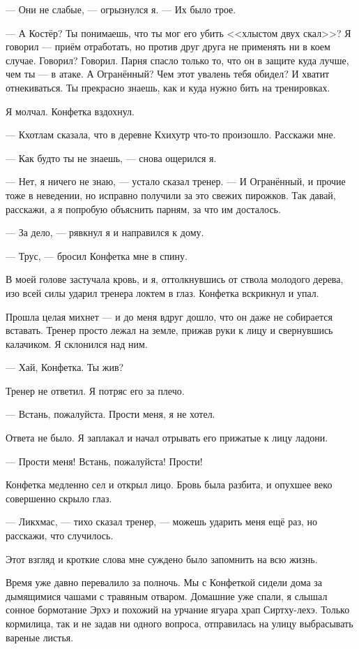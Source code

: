 --- Они не слабые, --- огрызнулся я.
--- Их было трое.

--- А Костёр?
Ты понимаешь, что ты мог его убить <<хлыстом двух скал>>?
Я говорил --- приём отработать, но против друг друга не применять ни в коем случае.
Говорил?
Говорил.
Парня спасло только то, что он в защите куда лучше, чем ты --- в атаке.
А Огранённый?
Чем этот увалень тебя обидел?
И хватит отнекиваться.
Ты прекрасно знаешь, как и куда нужно бить на тренировках.

Я молчал.
Конфетка вздохнул.

--- Кхотлам сказала, что в деревне Кхихутр что-то произошло.
Расскажи мне.

--- Как будто ты не знаешь, --- снова ощерился я.

--- Нет, я ничего не знаю, --- устало сказал тренер.
--- И Огранённый, и прочие тоже в неведении, но исправно получили за это свежих пирожков.
Так давай, расскажи, а я попробую объяснить парням, за что им досталось.

--- За дело, --- рявкнул я и направился к дому.

--- Трус, --- бросил Конфетка мне в спину.

В моей голове застучала кровь, и я, оттолкнувшись от ствола молодого дерева, изо всей силы ударил тренера локтем в глаз.
Конфетка вскрикнул и упал.

Прошла целая михнет --- и до меня вдруг дошло, что он даже не собирается вставать.
Тренер просто лежал на земле, прижав руки к лицу и свернувшись калачиком.
Я склонился над ним.

--- Хай, Конфетка.
Ты жив?

Тренер не ответил.
Я потряс его за плечо.

--- Встань, пожалуйста.
Прости меня, я не хотел.

Ответа не было.
Я заплакал и начал отрывать его прижатые к лицу ладони.

--- Прости меня!
Встань, пожалуйста!
Прости!

Конфетка медленно сел и открыл лицо.
Бровь была разбита, и опухшее веко совершенно скрыло глаз.

--- Ликхмас, --- тихо сказал тренер, --- можешь ударить меня ещё раз, но расскажи, что случилось.

Этот взгляд и кроткие слова мне суждено было запомнить на всю жизнь.

\asterism

Время уже давно перевалило за полночь.
Мы с Конфеткой сидели дома за дымящимися чашами с травяным отваром.
Домашние уже спали, я слышал сонное бормотание Эрхэ и похожий на урчание ягуара храп Сиртху-лехэ.
Только кормилица, так и не задав ни одного вопроса, отправилась на улицу выбрасывать вареные листья.

